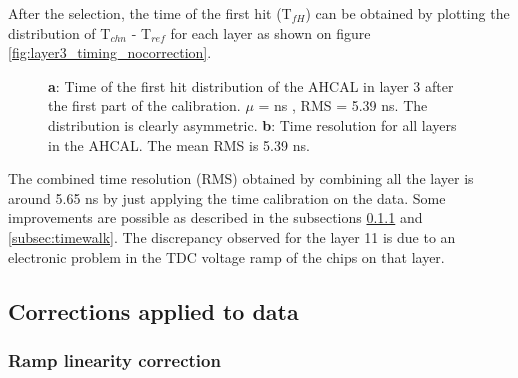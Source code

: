 \documentclass[twoside,a4paper,11pt]{article}
\begin{document}
After the selection, the time of the first hit (T$_{fH}$) can be obtained by plotting the distribution of T$_{chn}$ - T$_{ref}$ for each layer as shown on figure \ref{fig:layer3_timing_nocorrection}.
\begin{figure}[htbp]
	\hfill
	\hfill
\caption[]{\textbf{a}: Time of the first hit distribution of the AHCAL in layer 3 after the first part of the calibration. $\mu$ = ns , RMS = 5.39 ns. The distribution is clearly asymmetric. \textbf{b}: Time resolution for all layers in the AHCAL. The mean RMS is 5.39 ns.}
\end{figure}
The combined time resolution (RMS) obtained by combining all the layer is around 5.65 ns by just applying the time calibration on the data. Some improvements are possible as described in the subsections \ref{subsec:lin_corr} and \ref{subsec:timewalk}. The discrepancy observed for the layer 11 is due to an electronic problem in the TDC voltage ramp of the chips on that layer.

\subsection{Corrections applied to data}
\subsubsection{Ramp linearity correction}
\label{subsec:lin_corr}
\end{document}
